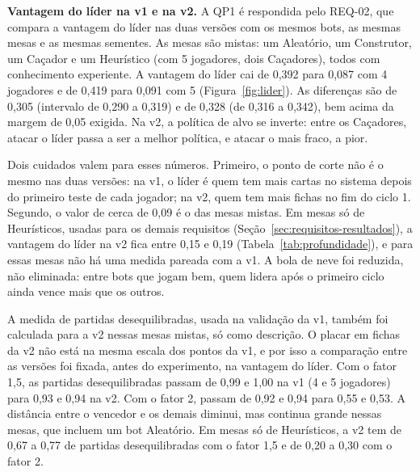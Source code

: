 \textbf{Vantagem do líder na v1 e na v2.} A QP1 é respondida pelo REQ-02, que compara a vantagem do líder nas duas
versões com os mesmos bots, as mesmas mesas e as mesmas sementes. As mesas são mistas: um Aleatório, um
Construtor, um Caçador e um Heurístico (com 5 jogadores, dois Caçadores), todos com conhecimento experiente. A
vantagem do líder cai de 0,392 para 0,087
com 4 jogadores e de 0,419 para 0,091 com 5 (Figura~\ref{fig:lider}). As diferenças são de 0,305 (intervalo de
0,290 a 0,319) e de 0,328 (de 0,316 a 0,342), bem acima da margem de 0,05 exigida. Na v2, a política de alvo se
inverte: entre os Caçadores, atacar o líder passa a ser a melhor política, e atacar o mais fraco, a pior.

Dois cuidados valem para esses números. Primeiro, o ponto de corte não é o mesmo nas duas versões: na
v1, o líder é quem tem mais cartas no sistema depois do primeiro teste de cada jogador; na v2, quem tem mais
fichas no fim do ciclo 1. Segundo, o valor de cerca de 0,09 é o das mesas mistas. Em mesas só de Heurísticos,
usadas para os demais requisitos (Seção~\ref{sec:requisitos-resultados}), a vantagem do líder na v2 fica entre
0,15 e 0,19 (Tabela~\ref{tab:profundidade}), e para essas mesas não há uma medida pareada com a v1. A bola de
neve foi reduzida, não eliminada: entre bots que jogam bem, quem lidera após o primeiro ciclo ainda vence mais
que os outros.

A medida de partidas desequilibradas, usada na validação da v1, também foi calculada para a v2 nessas
mesas mistas, só como descrição. O placar em fichas da v2 não está na mesma escala dos pontos da v1, e por isso a
comparação entre as versões foi fixada, antes do experimento, na vantagem do líder. Com o fator 1,5, as partidas
desequilibradas passam de 0,99 e 1,00 na v1 (4 e 5 jogadores) para 0,93 e 0,94 na v2. Com o fator 2, passam de
0,92 e 0,94 para 0,55 e 0,53. A distância entre o vencedor e os demais diminui, mas continua grande nessas
mesas, que incluem um bot Aleatório. Em mesas só de Heurísticos, a v2 tem de 0,67 a 0,77 de partidas
desequilibradas com o fator 1,5 e de 0,20 a 0,30 com o fator 2.


